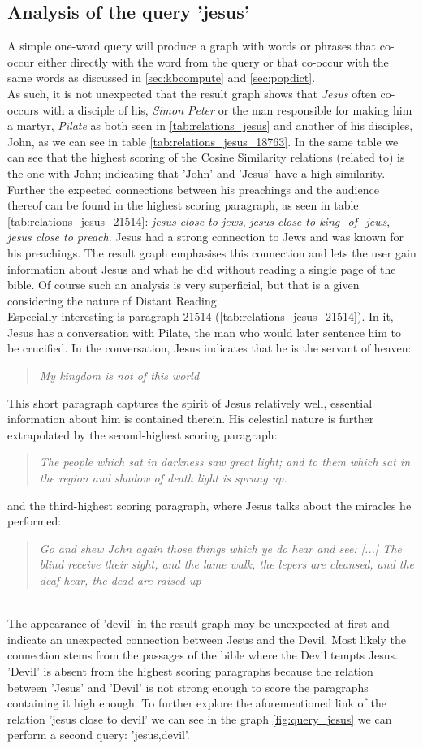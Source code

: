 \subsection{Analysis of the query 'jesus'}
\label{subsec:interpretation_jesus}
A simple one-word query will produce a graph with words or phrases that co-occur either directly with the word from the query or that co-occur with the same words as discussed in \ref{sec:kbcompute} and \ref{sec:popdict}.\\
As such, it is not unexpected that the result graph shows that \textit{Jesus} often co-occurs with a disciple of his, \textit{Simon Peter} or the man responsible for making him a martyr, \textit{Pilate} as both seen in \ref{tab:relations_jesus} and another of his disciples, John, as we can see in table \ref{tab:relations_jesus_18763}. In the same table we can see that the highest scoring of the Cosine Similarity relations (related to) is the one with John; indicating that 'John' and 'Jesus' have a high similarity. Further the expected connections between his preachings and the audience thereof can be found in the highest scoring paragraph, as seen in table \ref{tab:relations_jesus_21514}: \textit{jesus close to jews}, \textit{jesus close to king\_of\_jews}, \textit{jesus close to preach}. Jesus had a strong connection to Jews and was known for his preachings. The result graph emphasises this connection and lets the user gain information about Jesus and what he did without reading a single page of the bible. Of course such an analysis is very superficial, but that is a given considering the nature of Distant Reading.\\
Especially interesting is paragraph 21514 (\ref{tab:relations_jesus_21514}). In it, Jesus has a conversation with Pilate, the man who would later sentence him to be crucified. In the conversation, Jesus indicates that he is the servant of heaven: \blockquote{\textit{My kingdom is not of this world}}. This short paragraph captures the spirit of Jesus relatively well, essential information about him is contained therein. His celestial nature is further extrapolated by the second-highest scoring paragraph: \blockquote{\textit{The people which sat in darkness saw great light; and to them which sat in the region and shadow of death light is sprung up.}} and the third-highest scoring paragraph, where Jesus talks about the miracles he performed: \blockquote{\textit{Go and shew John again those things which ye do hear and see:  [...] The blind receive their sight,  and the lame walk, the lepers are cleansed, and the deaf hear, the dead are raised up}}.\\
The appearance of 'devil' in the result graph may be unexpected at first and indicate an unexpected connection between Jesus and the Devil. Most likely the connection stems from the passages of the bible where the Devil tempts Jesus. 'Devil' is absent from the highest scoring paragraphs because the relation between 'Jesus' and 'Devil' is not strong enough to score the paragraphs containing it high enough. To further explore the aforementioned link of the relation 'jesus close to devil' we can see in the graph \ref{fig:query_jesus} we can perform a second query: 'jesus,devil'.

